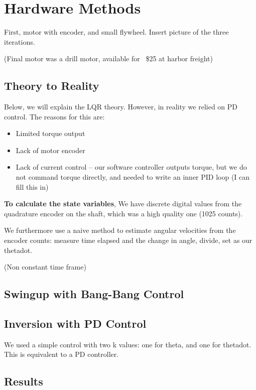 \documentclass[conference]{IEEEtran}
\begin{document}
\section{Hardware Methods}

First, motor with encoder, and small flywheel.
Insert picture of the three iterations.

(Final motor was a drill motor, available for ~\$25 at harbor freight)

\subsection{Theory to Reality}

Below, we will explain the LQR theory. However, in reality we relied on PD
control. The reasons for this are:

\begin{itemize}
    \item Limited torque output
    \item Lack of motor encoder
    \item Lack of current control -- our software controller outputs torque, but
    we do not command torque directly, and needed to write an inner PID loop  (I
    can fill this in)
\end{itemize}


\textbf{To calculate the state variables}, 
We have discrete digital values from the quadrature encoder on the shaft, which
was a high quality one (1025 counts).

We furthermore use a naive method to estimate angular velocities from the
encoder counts: measure time elapsed and the change in angle, divide, set as our
thetadot.

(Non constant time frame)

\subsection{Swingup with Bang-Bang Control}

\subsection{Inversion with PD Control}

We used a simple control with two k values: one for theta, and one for thetadot.
This is equivalent to a PD controller.

\subsection{Results}
\end{document}
